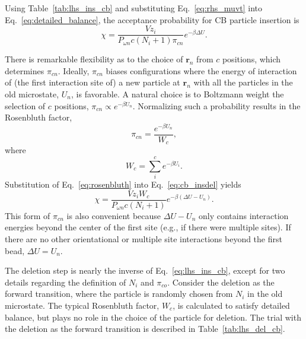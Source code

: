 Using Table~\ref{tab:lhs_ins_cb} and substituting Eq.~\ref{eq:rhs_muvt} into Eq.~\ref{eq:detailed_balance}, the acceptance probability for CB particle insertion is
\begin{equation}
\chi = \frac{Vz_i}{P_{\omega n}{c}(N_i+1)\pi_{cn}}e^{-\beta\Delta U}.
\label{eq:cb_insdel}
\end{equation}

There is remarkable flexibility as to the choice of $\mathbf{r}_n$ from $c$ positions, which determines $\pi_{cn}$.
Ideally, $\pi_{cn}$ biases configurations where the energy of interaction of (the first interaction site of) a new particle at $\mathbf{r}_n$ with all the particles in the old microstate, $U_n$, is favorable.
A natural choice is to Boltzmann weight the selection of $c$ positions, $\pi_{cn} \propto e^{-\beta U_n}$.
Normalizing such a probability results in the Rosenbluth factor,
\begin{equation}
\pi_{cn} = \frac{e^{-\beta U_n}}{W_{c}},
\label{eq:rosenbluth}
\end{equation}
where
\begin{equation}
W_{c}=\sum_{i}^{c} e^{-\beta U_i}.
\label{eq:wc}
\end{equation}
Substitution of Eq.~\ref{eq:rosenbluth} into Eq.~\ref{eq:cb_insdel} yields
\begin{equation}
\chi = \frac{Vz_i W_{c}}{P_{\omega n}{c}(N_i+1)}e^{-\beta(\Delta U - U_n)}.
\label{eq:lhs_ins_cb}
\end{equation}
This form of $\pi_{cn}$ is also convenient because $\Delta U - U_n$ only contains interaction energies beyond the center of the first site (e.g., if there were multiple sites).
If there are no other orientational or multiple site interactions beyond the first bead, $\Delta U = U_n$.

The deletion step is nearly the inverse of Eq.~\ref{eq:lhs_ins_cb}, except for two details regarding the definition of $N_i$ and $\pi_{co}$.
Consider the deletion as the forward transition, where the particle is randomly chosen from $N_i$ in the old microstate.
The typical Rosenbluth factor, $W_{c}$, is calculated to satisfy detailed balance, but plays no role in the choice of the particle for deletion.
The trial with the deletion as the forward transition is described in Table~\ref{tab:lhs_del_cb}.

